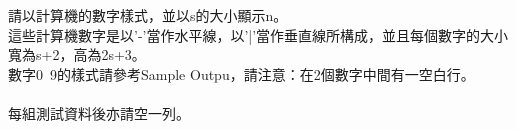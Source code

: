 請以計算機的數字樣式，並以s的大小顯示n。\\
這些計算機數字是以'-'當作水平線，以'|'當作垂直線所構成，並且每個數字的大小寬為s+2，高為2s+3。\\
數字0~9的樣式請參考Sample Outpu，請注意：在2個數字中間有一空白行。\\
\\
每組測試資料後亦請空一列。\\
